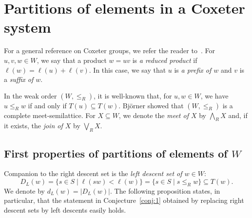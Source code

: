 \documentclass[ALCO,Unicode]{cedram}
\theoremstyle{definition}
\begin{document}
\section{Partitions of elements in a Coxeter system}\label{se:1}

For a general reference on Coxeter groups, we refer the reader to~\cite{BjBr05}. For $u,v,w\in W$, we say that a product $w=uv$ is {\em a reduced product} if $\ell(w)=\ell(u)+\ell(v)$. In this case, we say that $u$ is {\em a prefix of $w$} and $v$ is a {\em suffix of $w$}.  

In  the weak order $(W,\leq_R)$, it is well-known that, for $u,w\in W$, we have $u\leq_R w$ if and only if $T(u)\subseteq T(w)$. Bj\" orner showed that $(W,\leq_R)$ is a complete meet-semilattice.  For $X\subseteq W$, we denote the {\em meet of $X$} by $\bigwedge_R X$   and, if it exists, the {\em join of $X$} by $\bigvee_R X$.

\subsection{First properties of partitions of elements of \texorpdfstring{$W$}{W}} Companion to the right descent set is the {\em left descent set of $w\in W$}:
$$
D_L(w)=\{s\in S\mid \ell(sw)<\ell(w)\}=\{s\in S\mid s\leq_R w\}\subseteq T(w).
$$
We denote by $d_L(w)=|D_L(w)|$. The following proposition states, in particular, that the statement in  Conjecture~\ref{conj:1} obtained by replacing right descent sets  by left descents easily holds. 
 
\end{document}
